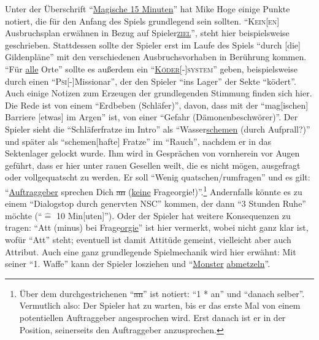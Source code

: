 \documentclass[a5paper,pagesize,numbers=noenddot]{scrbook}
\begin{document}
Unter der Überschrift \enquote{\uline{Magische 15 Minuten}} hat Mike Hoge einige Punkte notiert, die für den Anfang des Spiels grundlegend sein sollten.
\enquote{\textsc{Kein[en]} Ausbruchsplan erwähnen in Bezug auf Spieler\textsc{\uline{ziel}}}, steht hier beispielsweise geschrieben.
Stattdessen sollte der Spieler erst im Laufe des Spiels \enquote{durch [die] Gildenpläne} mit den verschiedenen Ausbruchsvorhaben in Berührung kommen.
\enquote{Für \uline{alle} Orte} sollte es außerdem ein \enquote{\textsc{\uline{Köder}}[-]\textsc{system}} geben, beispielsweise durch einen \enquote{\textsc{Psi}[-]Missionar}, der den Spieler \enquote{ins Lager} der Sekte \enquote{ködert}.
Auch einige Notizen zum Erzeugen der grundlegenden Stimmung finden sich hier.
Die Rede ist von einem \enquote{Erdbeben (Schläfer)}, davon, dass mit der \enquote{mag[ischen] Barriere [etwas] im Argen} ist, von einer \enquote{Gefahr (Dämonenbeschwörer)}.
Der Spieler sieht die \enquote{Schläferfratze im Intro} als \enquote{Wasser\uline{schemen} (durch Aufprall?)} und später als \enquote {schemen[hafte] Fratze} im \enquote{Rauch}, nachdem er in das Sektenlager gelockt wurde.
Ihm wird in Gesprächen von vornherein vor Augen geführt, dass er hier unter rauen Gesellen weilt, die es nicht mögen, ausgefragt oder vollgequatscht zu werden.
Er soll \enquote{Wenig quatschen/rumfragen} und es gilt: \enquote{\uline{Auftraggeber} sprechen Dich \sout{an} (\uline{keine} Frageorgie!)}.\footnote{Über dem durchgestrichenen \enquote{\sout{an}} ist notiert:
\enquote{1 * an} und \enquote{danach selber}.
Vermutlich also:
Der Spieler hat zu warten, bis er das erste Mal von einem potentiellen Auftraggeber angesprochen wird.
Erst danach ist er in der Position, seinerseits den Auftraggeber anzusprechen.}
Andernfalls könnte es zu einem \enquote{Dialogstop durch genervten NSC} kommen, der dann \enquote{3 Stunden Ruhe} möchte (\enquote{$\hat{=}$ 10 Min[uten]}).
Oder der Spieler hat weitere Konsequenzen zu tragen:
\enquote{Att (minus) bei Frage\uline{orgie}} ist hier vermerkt, wobei nicht ganz klar ist, wofür \enquote{Att} steht; eventuell ist damit Attitüde gemeint, vielleicht aber auch Attribut. %
Auch eine ganz grundlegende Spielmechanik wird hier erwähnt:
Mit seiner \enquote{1. Waffe} kann der Spieler losziehen und \enquote{\uline{Monster} \uline{abmetzeln}}.


\end{document}
